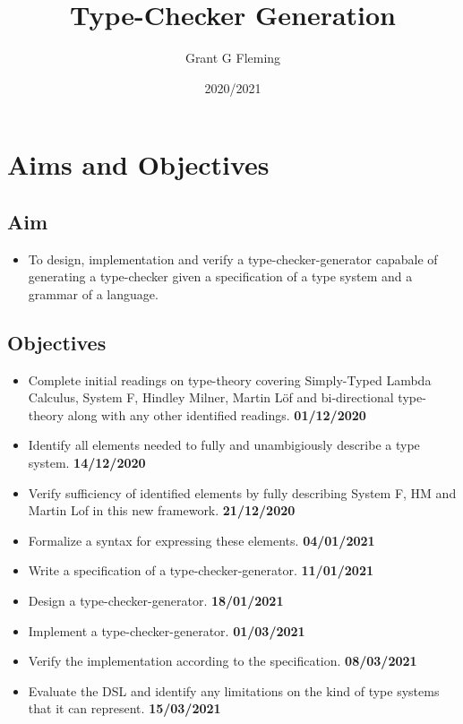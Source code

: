 \documentclass{ProgressReport}[2020/09/15]
\title{Type-Checker Generation}
\author{Grant G Fleming}
\date{2020/2021}
\begin{document}
	\maketitle
	\tableofcontents
        
        \chapter{Aims and Objectives}

        \section{Aim}

        \begin{itemize}
          \item To design, implementation and verify a
            type-checker-generator capabale of generating a
            type-checker given a specification of a type system and a
            grammar of a language. 
        \end{itemize}
        
        \section{Objectives}

        \begin{itemize}
          \item Complete initial readings on type-theory covering
            Simply-Typed Lambda Calculus, System F, Hindley Milner,
            Martin L\"{o}f and bi-directional type-theory along with
            any other identified readings. \textbf{01/12/2020}
          \item Identify all elements needed to fully and
            unambigiously describe a type system. \textbf{14/12/2020} 
          \item Verify sufficiency of identified elements by fully describing
            System F, HM and Martin Lof in this new framework. \textbf{21/12/2020}
          \item Formalize a syntax for expressing these elements. \textbf{04/01/2021}
          \item Write a specification of a type-checker-generator. \textbf{11/01/2021}
          \item Design a type-checker-generator. \textbf{18/01/2021} 
          \item Implement a type-checker-generator. \textbf{01/03/2021}
          \item Verify the implementation according to the
            specification. \textbf{08/03/2021}
          \item Evaluate the DSL and identify any limitations on the
            kind of type systems that it can represent. \textbf{15/03/2021}
        \end{itemize}
        
\end{document}
